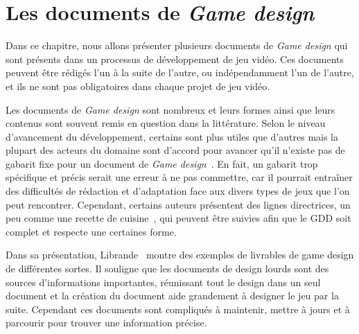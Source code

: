 \chapter{Les documents de \emph{Game design}}


Dans ce chapitre, nous allons pr\'esenter plusieurs documents de \emph{Game design} qui sont présents dans un processus de développement de jeu vidéo.
Ces documents peuvent être rédigés l'un à la suite de l'autre, ou indépendamment l'un de l'autre, et ils ne sont pas obligatoires dans chaque projet de jeu vidéo.



Les documents de \emph{Game design} sont nombreux et leurs formes ainsi que leurs contenus sont souvent remis en question dans la littérature.
Selon le niveau d'avancement du développement, certains sont plus utiles que d'autres mais la plupart des acteurs du domaine sont d'accord pour avancer qu'il n'existe pas de gabarit fixe pour un document de \emph{Game design}~\cite{GD_theory_rouse}.
En fait, un gabarit trop sp\'ecifique et précis serait une erreur à ne pas commettre, car il pourrait entraîner des difficultés de rédaction et d'adaptation face aux divers types de jeux que l'on peut rencontrer.
Cependant, certains auteurs présentent des lignes directrices, un peu comme une recette de cuisine~\cite{LevelUpRogers2014}, qui peuvent être suivies afin que le GDD soit complet et respecte une certaines forme. 

Dans sa présentation, Librande~\cite{onepage_librande} montre des exemples de livrables de game design de différentes sortes.
Il souligne que les documents de design lourds sont des sources d'informations importantes, réunissant tout le design dans un seul document et la création du document aide grandement à designer le jeu par la suite.
Cependant ces documents sont compliqués à maintenir, mettre à jours et à parcourir pour trouver une information précise.



